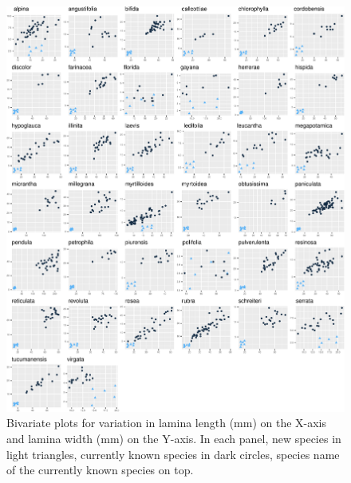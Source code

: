 \documentclass[fleqn,10pt,lineno]{wlpeerj} %
\begin{document}
\begin{figure}[ht]
\centering
\includegraphics[width=\linewidth]{fig1}
\caption{Bivariate plots for variation in lamina length (mm) on the X-axis and lamina width (mm) on the Y-axis. In each panel, new species in light triangles, currently known species in dark circles, species name of the currently known species on top.}
\label{fig:fig1}
\end{figure}
\end{document}
